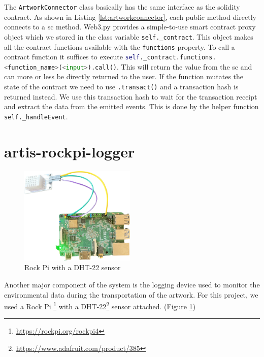 The \texttt{ArtworkConnector} class basically has the same interface as the solidity contract. As shown in Listing \ref{lst:artworkconnector}, each public method directly connects to a \gls{sc} method. Web3.py provides a simple-to-use smart contract proxy object which we stored in the class variable \texttt{self.\_contract}. This object makes all the contract functions available with the \texttt{functions} property. To call a contract function it suffices to execute \lstinline[language=Python]!self._contract.functions.<function_name>(<input>).call()!.
This will return the value from the \gls{sc} and can more or less be directly returned to the user. If the function mutates the state of the contract we need to use \lstinline[language=Python]!.transact()! and a transaction hash is returned instead. We use this transaction hash to wait for the transaction receipt and extract the data from the emitted events. This is done by the helper function \texttt{self.\_handleEvent}.



\clearpage
\section{artis-rockpi-logger}
\begin{figure} %
    \centering
    \includegraphics[width=0.49\textwidth]{resources/rock-pi.png}
    \caption{Rock Pi with a DHT-22 sensor} 
    \label{fig:rock-pi}
\end{figure}
Another major component of the system is the logging device used to monitor the environmental data during the transportation of the artwork. For this project, we used a Rock Pi \footnote{\href{https://rockpi.org/rockpi4}{https://rockpi.org/rockpi4}} with a DHT-22\footnote{\href{https://www.adafruit.com/product/385}{https://www.adafruit.com/product/385}} sensor attached. (Figure \ref{fig:rock-pi})

